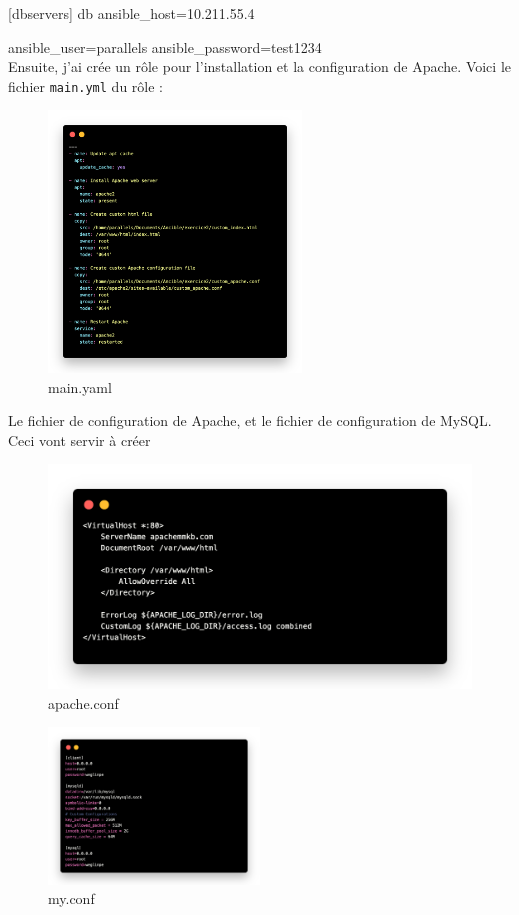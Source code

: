 \documentclass[12pt, a4paper]{article}
\begin{document}
[dbservers]
db ansible\_host=10.211.55.4 

ansible\_user=parallels ansible\_password=test1234\\

Ensuite, j'ai crée un rôle pour l'installation et la configuration de Apache.
Voici le fichier \texttt{main.yml} du rôle :\\
\begin{figure}[h]
    \centering
    \includegraphics[width=0.6\textwidth]{img/yaml-apache.png}
    \caption{main.yaml}
    \label{fig:1}
\end{figure}

\newpage
Le fichier de configuration de Apache, et le fichier de configuration de MySQL. 
Ceci vont servir à créer 
\begin{figure}[h]
	\centering
	\includegraphics[width=1\textwidth]{img/apache-conf.png}
	\caption{apache.conf}
	\label{fig:1}
\end{figure}
\begin{figure}[h]
	\centering
	\includegraphics[width=0.5\textwidth]{img/my.png}
	\caption{my.conf}
	\label{fig:1}
\end{figure}
\end{document}
